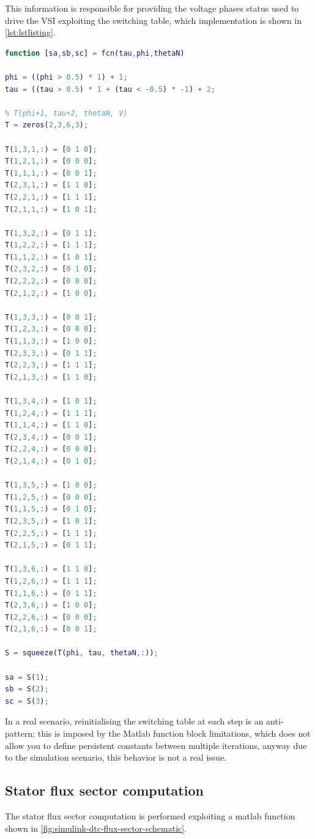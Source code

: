 This information is responsible for providing the voltage phases status used to drive the VSI exploiting the switching table, which implementation is shown in \autoref{lst:lstlisting}.

\begin{lstlisting}[language=matlab,label={lst:lstlisting},caption=Switching table implemetation]
function [sa,sb,sc] = fcn(tau,phi,thetaN)

phi = ((phi > 0.5) * 1) + 1;
tau = ((tau > 0.5) * 1 + (tau < -0.5) * -1) + 2;

% T(phi+1, tau+2, thetaN, V)
T = zeros(2,3,6,3);

T(1,3,1,:) = [0 1 0];
T(1,2,1,:) = [0 0 0];
T(1,1,1,:) = [0 0 1];
T(2,3,1,:) = [1 1 0];
T(2,2,1,:) = [1 1 1];
T(2,1,1,:) = [1 0 1];

T(1,3,2,:) = [0 1 1];
T(1,2,2,:) = [1 1 1];
T(1,1,2,:) = [1 0 1];
T(2,3,2,:) = [0 1 0];
T(2,2,2,:) = [0 0 0];
T(2,1,2,:) = [1 0 0];

T(1,3,3,:) = [0 0 1];
T(1,2,3,:) = [0 0 0];
T(1,1,3,:) = [1 0 0];
T(2,3,3,:) = [0 1 1];
T(2,2,3,:) = [1 1 1];
T(2,1,3,:) = [1 1 0];

T(1,3,4,:) = [1 0 1];
T(1,2,4,:) = [1 1 1];
T(1,1,4,:) = [1 1 0];
T(2,3,4,:) = [0 0 1];
T(2,2,4,:) = [0 0 0];
T(2,1,4,:) = [0 1 0];

T(1,3,5,:) = [1 0 0];
T(1,2,5,:) = [0 0 0];
T(1,1,5,:) = [0 1 0];
T(2,3,5,:) = [1 0 1];
T(2,2,5,:) = [1 1 1];
T(2,1,5,:) = [0 1 1];

T(1,3,6,:) = [1 1 0];
T(1,2,6,:) = [1 1 1];
T(1,1,6,:) = [0 1 1];
T(2,3,6,:) = [1 0 0];
T(2,2,6,:) = [0 0 0];
T(2,1,6,:) = [0 0 1];

S = squeeze(T(phi, tau, thetaN,:));

sa = S(1);
sb = S(2);
sc = S(3);
\end{lstlisting}

In a real scenario, reinitialising the switching table at each step is an anti-pattern; this is imposed by the Matlab function block limitations, which does not allow you to define persistent constants between multiple iterations, anyway due to the simulation scenario, this behavior is not a real issue.

\subsection{Stator flux sector computation}

The stator flux sector computation is performed exploiting a matlab function shown in \autoref{fig:simulink-dtc-flux-sector-schematic}.

